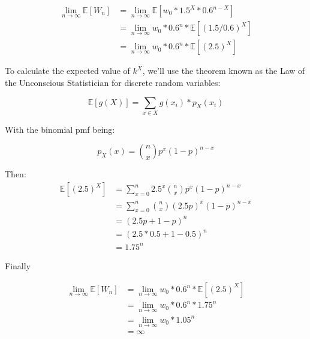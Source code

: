 \documentclass[12pt]{article}
\begin{document}
\begin{equation*}
  \begin{split}
    \lim_{n\to\infty}\mathbb{E}[W_n] &= \lim_{n\to\infty}\mathbb{E}[w_0 * 1.5^X * 0.6^{n-X}]\\
    & = \lim_{n\to\infty} w_0 * 0.6^n * \mathbb{E}[(1.5/0.6)^X]\\
    & = \lim_{n\to\infty} w_0 * 0.6^n * \mathbb{E}[(2.5)^X]
  \end{split}
\end{equation*}

To calculate the expected value of $k^X$, we'll use the theorem known as the Law of the Unconscious Statistician for discrete random variables:

\begin{equation}
    \mathbb{E}[g(X)] = \sum\limits_{x \in X} g(x_i)*p_X(x_i)
\end{equation}

With the binomial pmf being:

\begin{equation}
    p_X(x) = {n \choose x} p^x (1-p)^{n-x}
\end{equation}

Then:
\begin{equation*}
  \begin{split}
    \mathbb{E}[(2.5)^X] &= \sum\limits_{x=0}^{n} 2.5^x {n \choose x} p^x (1-p)^{n-x}\\
    &= \sum\limits_{x=0}^{n} {n \choose x} (2.5p)^x (1-p)^{n-x}\\
    &= (2.5p + 1 - p)^n\\
    &= (2.5*0.5+1-0.5)^n\\
    & = 1.75^n
  \end{split}
\end{equation*}

Finally

\begin{equation*}
  \begin{split}
    \lim_{n\to\infty}\mathbb{E}[W_n] &= \lim_{n\to\infty} w_0 * 0.6^n * \mathbb{E}[(2.5)^X]\\
    &= \lim_{n\to\infty} w_0 * 0.6^n * 1.75^n\\
    &= \lim_{n\to\infty} w_0 * 1.05^n\\
    &= \infty
  \end{split}
\end{equation*}
\end{document}
